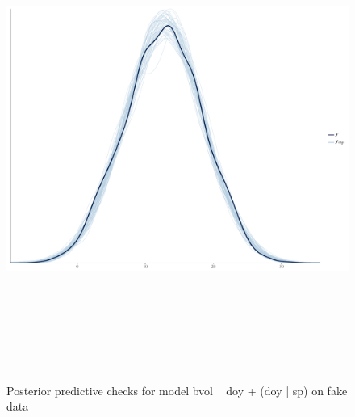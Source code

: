 \documentclass{article}\usepackage[]{graphicx}\usepackage[]{color}
\begin{document}
\begin{figure}[h!]
\includegraphics[width=15cm, height=15cm]{fake_data_pp_check_final.pdf}\\
\caption{Posterior predictive checks for model bvol ~ doy + (doy | sp) on fake data}
\end{figure}
\end{document}
